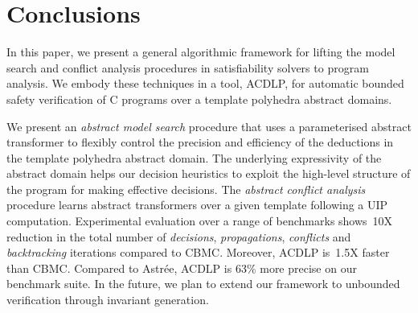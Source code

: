 \section{Conclusions}
In this paper, we present a general algorithmic framework for lifting 
the model search and conflict analysis procedures in satisfiability 
solvers to program analysis.  We embody these techniques in a tool, ACDLP,  
for automatic bounded safety verification of C programs over a template 
polyhedra abstract domains.  

We present an {\em abstract model search} procedure that uses a 
parameterised abstract transformer to flexibly control the precision and 
efficiency of the deductions in the template polyhedra abstract domain. 
The underlying expressivity of the abstract domain helps our decision 
heuristics to exploit the high-level structure of the program for making 
effective decisions.  The {\em abstract conflict analysis} procedure learns 
abstract transformers over a given template following a UIP computation.
Experimental evaluation over a range of benchmarks shows~10X
reduction in the total number of {\em decisions}, {\em propagations}, 
{\em conflicts} and {\em backtracking} iterations compared to CBMC.  Moreover, 
ACDLP is~1.5X faster than CBMC.  Compared to Astr{\'e}e, ACDLP is {63\%} more 
precise on our benchmark suite.  In the future, we plan to
extend our framework to unbounded verification through invariant generation. 


